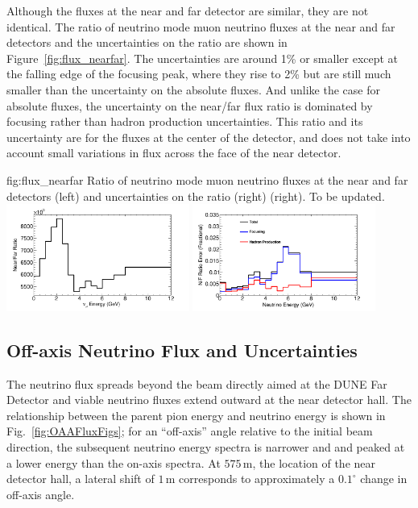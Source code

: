 Although the fluxes at the near and far detector are similar, they are not identical.  The ratio of neutrino mode muon neutrino fluxes at the near and far detectors and the uncertainties on the ratio are shown in  Figure~\ref{fig:flux_nearfar}.  The uncertainties are around 1\% or smaller except at the falling edge of the focusing peak, where they rise to 2\% but are still much smaller than the uncertainty on the absolute fluxes.    And unlike the case for absolute fluxes, the uncertainty on the near/far flux ratio is dominated by focusing rather than hadron production uncertainties.  This ratio and its uncertainty are for the fluxes at the center of the detector, and does not take into account small variations in flux across the face of the near detector.     

\begin{dunefigure}{fig:flux_nearfar}
{Ratio of neutrino mode muon neutrino fluxes at the near and far detectors (left) and uncertainties on the ratio (right) (right).  To be updated. }
    \includegraphics[width=0.45\textwidth]{graphics/nearfar.png}
     \includegraphics[width=0.45\textwidth]{graphics/nearfarunc.png}
\end{dunefigure}


\subsection{Off-axis Neutrino Flux and Uncertainties}

The neutrino flux spreads beyond the beam directly aimed at the DUNE Far Detector and viable neutrino fluxes extend outward at the near detector hall. The relationship between the parent pion energy and neutrino energy is shown in Fig.~\ref{fig:OAAFluxFigs}; for an ``off-axis'' angle relative to the initial beam direction, the subsequent neutrino energy spectra is narrower and and peaked at a lower energy than the on-axis spectra. At $575\,\textrm{m}$, the location of the near detector hall, a lateral shift of $1\,\textrm{m}$ corresponds to approximately a $0.1^\circ$ change in off-axis angle.

